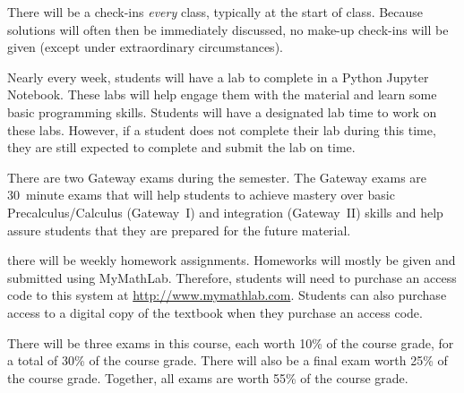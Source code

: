\documentclass[11pt,letterpaper]{article}
\begin{document}
There will be a check-ins \textit{every} class, typically at the start of class. Because solutions will often then be immediately discussed, no make-up check-ins will be given (except under extraordinary circumstances). \pspace


Nearly every week, students will have a lab to complete in a Python Jupyter Notebook. These labs will help engage them with the material and learn some basic programming skills. Students will have a designated lab time to work on these labs. However, if a student does not complete their lab during this time, they are still expected to complete and submit the lab on time.
\pspace


There are two Gateway exams during the semester. The Gateway exams are 30~minute exams that will help students to achieve mastery over basic Precalculus/Calculus (Gateway~I) and integration (Gateway~II) skills and help assure students that they are prepared for the future material. 
\pspace



\newpage



there will be weekly homework assignments. Homeworks will mostly be given and submitted using MyMathLab. Therefore, students will need to purchase an access code to this system at \url{http://www.mymathlab.com}. Students can also purchase access to a digital copy of the textbook when they purchase an access code.
\pspace


There will be three exams in this course, each worth 10\% of the course grade, for a total of 30\% of the course grade. There will also be a final exam worth 25\% of the course grade. Together, all exams are worth 55\% of the course grade. 
\pspace
\end{document}
